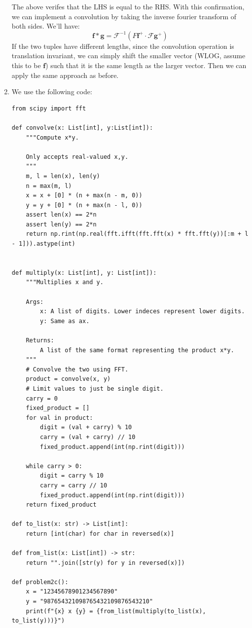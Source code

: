 \documentclass[12pt]{article}
\begin{document}
\begin{enumerate}[label=(\alph*)]
  The above verifes that the LHS is equal to the RHS. With this confirmation, we can implement a convolution by taking the inverse fourier transform of both sides. We'll have:
  \[
    \textbf{f} * \textbf{g} = \mathcal{F}^{-1}(F \textbf{f}^{+} \cdot \mathcal{F}\textbf{g}^{+})
  \]
  If the two tuples have different lengths, since the convolution operation is translation invariant, we can simply shift the smaller vector (WLOG, assume this to be $\textbf{f}$) such that it is the same length as the larger vector. Then we can apply the same approach as before.

  \item
    We use the following code:
    \begin{verbatim}
from scipy import fft

def convolve(x: List[int], y:List[int]):
    """Compute x*y.
    
    Only accepts real-valued x,y.
    """
    m, l = len(x), len(y)
    n = max(m, l)
    x = x + [0] * (n + max(n - m, 0))
    y = y + [0] * (n + max(n - l, 0))
    assert len(x) == 2*n
    assert len(y) == 2*n
    return np.rint(np.real(fft.ifft(fft.fft(x) * fft.fft(y))[:m + l - 1])).astype(int)
    

def multiply(x: List[int], y: List[int]):
    """Multiplies x and y.
    
    Args:
        x: A list of digits. Lower indeces represent lower digits.
        y: Same as ax.
        
    Returns:
        A list of the same format representing the product x*y.
    """
    # Convolve the two using FFT.
    product = convolve(x, y)
    # Limit values to just be single digit.
    carry = 0
    fixed_product = []
    for val in product:
        digit = (val + carry) % 10
        carry = (val + carry) // 10
        fixed_product.append(int(np.rint(digit)))
        
    while carry > 0:
        digit = carry % 10
        carry = carry // 10
        fixed_product.append(int(np.rint(digit)))
    return fixed_product

def to_list(x: str) -> List[int]:
    return [int(char) for char in reversed(x)]

def from_list(x: List[int]) -> str:
    return "".join([str(y) for y in reversed(x)])

def problem2c():
    x = "12345678901234567890"
    y = "987654321098765432109876543210"
    print(f"{x} x {y} = {from_list(multiply(to_list(x), to_list(y)))}")
    \end{verbatim}


\end{enumerate}
\end{document}

